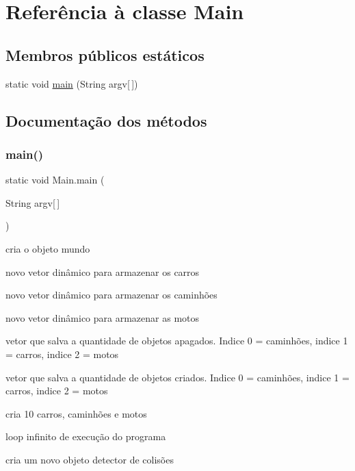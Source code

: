 \hypertarget{class_main}{}\section{Referência à classe Main}
\label{class_main}
\subsection*{Membros públicos estáticos}
\begin{DoxyCompactItemize}
\item 
static void \mbox{\hyperlink{class_main_a54c9709d2de6897d6f13e9af08ef177f}{main}} (String argv\mbox{[}$\,$\mbox{]})
\end{DoxyCompactItemize}


\subsection{Documentação dos métodos}
\mbox{\label{class_main_a54c9709d2de6897d6f13e9af08ef177f}} 
\subsubsection{\texorpdfstring{main()}{main()}}
{\footnotesize\ttfamily static void Main.\+main (\begin{DoxyParamCaption}\item[{String}]{argv\mbox{[}$\,$\mbox{]} }\end{DoxyParamCaption})\hspace{0.3cm}{\ttfamily [static]}}

cria o objeto mundo

novo vetor dinâmico para armazenar os carros

novo vetor dinâmico para armazenar os caminhões

novo vetor dinâmico para armazenar as motos

vetor que salva a quantidade de objetos apagados. Indice 0 = caminhões, indice 1 = carros, indice 2 = motos

vetor que salva a quantidade de objetos criados. Indice 0 = caminhões, indice 1 = carros, indice 2 = motos

cria 10 carros, caminhões e motos

loop infinito de execução do programa

cria um novo objeto detector de colisões

